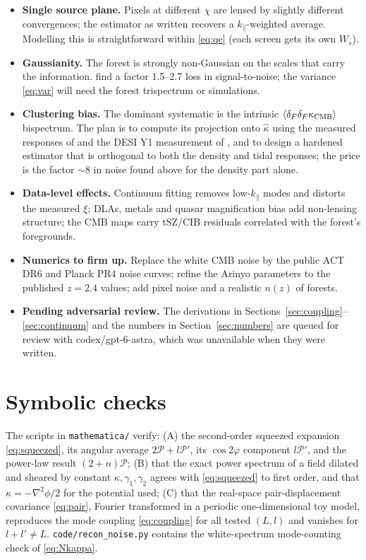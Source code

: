 \documentclass[11pt,a4paper]{article}
\newcommand{\dF}{\delta_F}
\newcommand{\kpar}{k_\parallel}
\newcommand{\PP}{\mathcal{P}}
\newcommand{\kcmb}{\kappa_{\rm CMB}}
\begin{document}
\begin{itemize}
\item \textbf{Single source plane.} Pixels at different $\chi$ are lensed by slightly different convergences; the estimator as written recovers a $\kpar$-weighted average. Modelling this is straightforward within \eqref{eq:qe} (each screen gets its own $W_s$).
\item \textbf{Gaussianity.} The forest is strongly non-Gaussian on the scales that carry the information. \citet{2209.04564} find a factor 1.5--2.7 loss in signal-to-noise; the variance \eqref{eq:var} will need the forest trispectrum or simulations.
\item \textbf{Clustering bias.} The dominant systematic is the intrinsic $\langle\dF\dF\kcmb\rangle$ bispectrum. The plan is to compute its projection onto $\hat\kappa$ using the measured responses of \citet{1701.03375} and the DESI Y1 measurement of \citet{2405.14988}, and to design a hardened estimator that is orthogonal to both the density and tidal responses; the price is the factor $\sim8$ in noise found above for the density part alone.
\item \textbf{Data-level effects.} Continuum fitting removes low-$\kpar$ modes and distorts the measured $\xi$; DLAs, metals and quasar magnification bias \citep{1004.1165} add non-lensing structure; the CMB maps carry tSZ/CIB residuals correlated with the forest's foregrounds.
\item \textbf{Numerics to firm up.} Replace the white CMB noise by the public ACT DR6 and Planck PR4 noise curves; refine the Arinyo parameters to the published $z=2.4$ values; add pixel noise and a realistic $n(z)$ of forests.
\item \textbf{Pending adversarial review.} The derivations in Sections~\ref{sec:coupling}--\ref{sec:continuum} and the numbers in Section~\ref{sec:numbers} are queued for review with codex/gpt-6-astra, which was unavailable when they were written.
\end{itemize}

\appendix
\section{Symbolic checks}
The scripts in \texttt{mathematica/} verify: (A) the second-order squeezed expansion \eqref{eq:squeezed}, its angular average $2\PP+l\PP'$, its $\cos2\varphi$ component $l\PP'$, and the power-law result $(2+n)\PP$; (B) that the exact power spectrum of a field dilated and sheared by constant $\kappa,\gamma_1,\gamma_2$ agrees with \eqref{eq:squeezed} to first order, and that $\kappa=-\nabla^2\phi/2$ for the potential used; (C) that the real-space pair-displacement covariance \eqref{eq:pair}, Fourier transformed in a periodic one-dimensional toy model, reproduces the mode coupling \eqref{eq:coupling} for all tested $(L,l)$ and vanishes for $l+l'\neq L$. \texttt{code/recon\_noise.py} contains the white-spectrum mode-counting check of \eqref{eq:Nkappa}.
\end{document}

